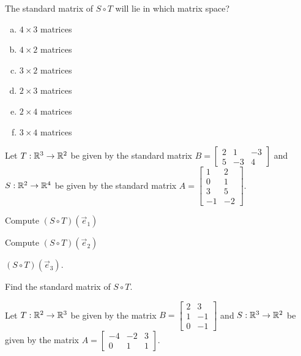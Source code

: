 \begin{applicationActivities}{1}{21}
\begin{activity}{2}
The standard matrix of $S \circ T$ will lie in which matrix space?
\begin{enumerate}[(a)]
\item $4 \times 3$ matrices
\item $4 \times 2$ matrices
\item $3 \times 2$ matrices
\item $2 \times 3$ matrices
\item $2 \times 4$ matrices
\item $3 \times 4$ matrices
\end{enumerate}
\end{activity}

\begin{activity}{15}
Let $T: \mathbb{R}^3 \rightarrow \mathbb{R}^2$ be given by the standard matrix $B=\begin{bmatrix} 2 & 1 & -3 \\ 5 & -3 & 4 \end{bmatrix}$ and $S: \mathbb{R}^2 \rightarrow \mathbb{R}^4$ be given by the standard matrix $A=\begin{bmatrix} 1 & 2 \\ 0 & 1 \\ 3 & 5 \\ -1 & -2 \end{bmatrix}$.

\begin{subactivity}
Compute $(S \circ T)(\vec{e}_1)$
\end{subactivity}
\begin{subactivity}
Compute  $(S \circ T)(\vec{e}_2)$
\end{subactivity}
\begin{subactivity}
$(S \circ T)(\vec{e}_3)$.
\end{subactivity}
\begin{subactivity}
Find the standard matrix of $S \circ T$. 
\end{subactivity}
\end{activity}


\begin{activity}{2}
Let $T: \mathbb{R}^2 \rightarrow \mathbb{R}^3$ be given by the matrix $B=\begin{bmatrix} 2 & 3 \\ 1 & -1 \\ 0 & -1 \end{bmatrix}$ and $S: \mathbb{R}^3 \rightarrow \mathbb{R}^2$ be given by the matrix $A=\begin{bmatrix} -4 & -2 & 3 \\ 0 & 1 & 1 \end{bmatrix}$.


\end{activity}
\end{applicationActivities}
